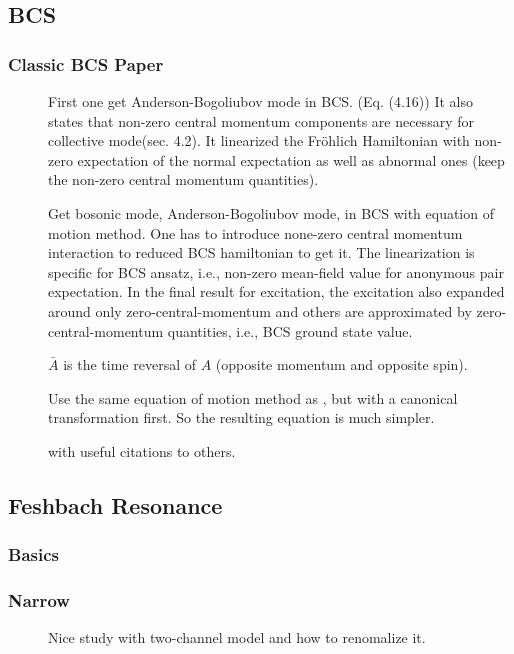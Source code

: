 \subsection{BCS}
\subsubsection{Classic BCS Paper}

\begin{description}
 \item [\cite{BogoliubovColl}] First one get Anderson-Bogoliubov mode in BCS.  (Eq. (4.16))  It also states that non-zero central momentum components are necessary for collective mode(sec. 4.2).  It linearized the Fr\"{o}hlich Hamiltonian with non-zero expectation of the normal expectation as well as abnormal ones (keep the non-zero central momentum quantities). 
  \item [\cite{AndersonBCS}]Get bosonic mode, Anderson-Bogoliubov mode, in BCS with  equation of motion method.  One has to introduce none-zero central momentum interaction to reduced BCS hamiltonian to get it.  The linearization is specific for BCS ansatz, i.e., non-zero mean-field value for anonymous pair expectation. In the final result for excitation, the excitation also expanded around only zero-central-momentum and others are approximated by zero-central-momentum quantities, i.e., BCS ground state value. 
   
   $\bar{A}$ is the time reversal of $A$ (opposite momentum and opposite spin).
	 
\item[\cite{Rickayzen}] Use the same equation of motion method as \cite{AndersonBCS}, but with a canonical transformation first.  So the resulting equation is much simpler. 
\item[ \cite{BcsExact}] with useful citations to others.        
 \end{description}


\subsection{Feshbach Resonance}
\subsubsection{Basics}
\subsubsection{Narrow}
\begin{description}
  \item [\cite{JacksonNarrow}]Nice study with two-channel model and how to renomalize it. 
	
 \end{description}
 
